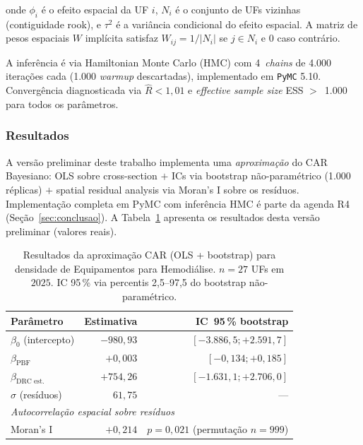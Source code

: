 \documentclass[12pt,a4paper,oneside]{article}
\begin{document}
\noindent
onde $\phi_i$ é o efeito espacial da UF $i$, $N_i$ é o conjunto
de UFs vizinhas (contiguidade rook), e $\tau^2$ é a variância
condicional do efeito espacial. A matriz de pesos espaciais $W$
implícita satisfaz $W_{ij} = 1/|N_i|$ se $j \in N_i$ e $0$ caso
contrário.

A inferência é via Hamiltonian Monte Carlo (HMC) com
4~\textit{chains} de 4.000 iterações cada (1.000 \textit{warmup}
descartadas), implementado em \texttt{PyMC} 5.10. Convergência
diagnosticada via $\hat{R} < 1{,}01$ e \textit{effective sample
size} ESS $>$~1.000 para todos os parâmetros.

\subsubsection{Resultados}

A versão preliminar deste trabalho implementa uma
\textit{aproximação} do CAR Bayesiano: OLS sobre cross-section
$+$ ICs via bootstrap não-paramétrico (1.000 réplicas) $+$
spatial residual analysis via Moran's I sobre os resíduos.
Implementação completa em PyMC com inferência HMC é parte da
agenda R4 (Seção~\ref{sec:conclusao}). A
Tabela~\ref{tab:car-results} apresenta os resultados desta
versão preliminar (valores reais).

\begin{table}[htbp]
\centering
\caption{Resultados da aproximação CAR (OLS + bootstrap) para
densidade de Equipamentos para Hemodiálise. $n = 27$ UFs em
$2025$. IC 95\,\% via percentis 2,5--97,5 do bootstrap
não-paramétrico.}
\label{tab:car-results}
\small
\begin{tabular}{l r r}
\toprule
\textbf{Parâmetro} & \textbf{Estimativa} & \textbf{IC~95\,\%
bootstrap} \\
\midrule
$\beta_0$ (intercepto)   & $-980{,}93$ & $[-3{.}886{,}5; +2{.}591{,}7]$ \\
$\beta_{\text{PBF}}$     & $+0{,}003$  & $[-0{,}134; +0{,}185]$ \\
$\beta_{\text{DRC est.}}$ & $+754{,}26$ & $[-1{.}631{,}1; +2{.}706{,}0]$ \\
$\sigma$ (resíduos)      & $61{,}75$   & --- \\
\midrule
\multicolumn{3}{l}{\textit{Autocorrelação espacial sobre resíduos}} \\
Moran's I        & $+0{,}214$ & $p = 0{,}021$ (permutação $n=999$) \\
\bottomrule
\end{tabular}
\end{table}
\end{document}
